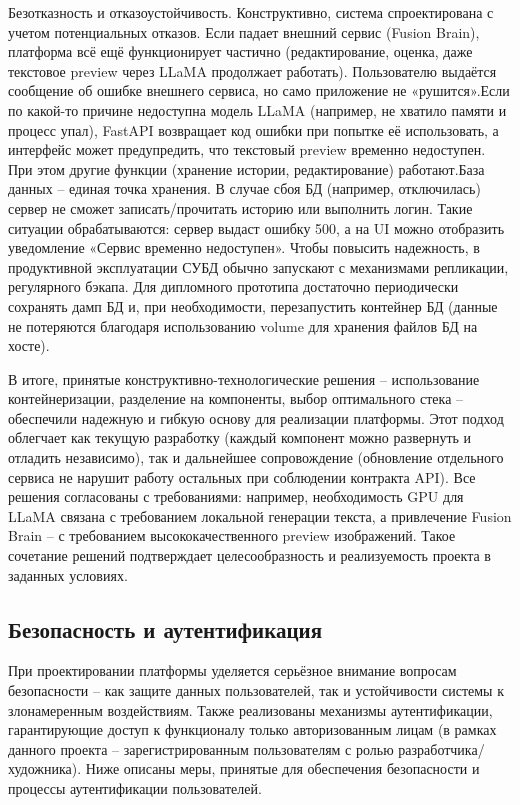 Безотказность и отказоустойчивость. Конструктивно, система спроектирована с учетом потенциальных отказов. Если падает внешний сервис (Fusion Brain), платформа всё ещё функционирует частично (редактирование, оценка, даже текстовое preview через LLaMA продолжает работать). Пользователю выдаётся сообщение об ошибке внешнего сервиса, но само приложение не «рушится».Если по какой-то причине недоступна модель LLaMA (например, не хватило памяти и процесс упал), FastAPI возвращает код ошибки при попытке её использовать, а интерфейс может предупредить, что текстовый preview временно недоступен. При этом другие функции (хранение истории, редактирование) работают.База данных – единая точка хранения. В случае сбоя БД (например, отключилась) сервер не сможет записать/прочитать историю или выполнить логин. Такие ситуации обрабатываются: сервер выдаст ошибку 500, а на UI можно отобразить уведомление «Сервис временно недоступен». Чтобы повысить надежность, в продуктивной эксплуатации СУБД обычно запускают с механизмами репликации, регулярного бэкапа. Для дипломного прототипа достаточно периодически сохранять дамп БД и, при необходимости, перезапустить контейнер БД (данные не потеряются благодаря использованию volume для хранения файлов БД на хосте).

В итоге, принятые конструктивно-технологические решения – использование контейнеризации, разделение на компоненты, выбор оптимального стека – обеспечили надежную и гибкую основу для реализации платформы. Этот подход облегчает как текущую разработку (каждый компонент можно развернуть и отладить независимо), так и дальнейшее сопровождение (обновление отдельного сервиса не нарушит работу остальных при соблюдении контракта API). Все решения согласованы с требованиями: например, необходимость GPU для LLaMA связана с требованием локальной генерации текста, а привлечение Fusion Brain – с требованием высококачественного preview изображений. Такое сочетание решений подтверждает целесообразность и реализуемость проекта в заданных условиях.

\subsection{Безопасность и аутентификация}

При проектировании платформы уделяется серьёзное внимание вопросам безопасности – как защите данных пользователей, так и устойчивости системы к злонамеренным воздействиям. Также реализованы механизмы аутентификации, гарантирующие доступ к функционалу только авторизованным лицам (в рамках данного проекта – зарегистрированным пользователям с ролью разработчика/художника). Ниже описаны меры, принятые для обеспечения безопасности и процессы аутентификации пользователей.


